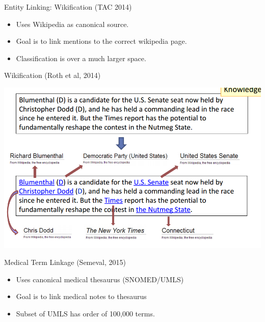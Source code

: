 \documentclass{beamer}
\begin{document}
\begin{frame}{Entity Linking: Wikification (TAC 2014)}
  \begin{itemize}
  \item Uses Wikipedia as canonical source.

    \air
  \item Goal is to link mentions to the correct wikipedia page. 

    \air
  \item Classification is over a much larger space. 
  \end{itemize}
\end{frame}


\begin{frame}{Wikification (Roth et al, 2014)}
  \begin{center}
    \includegraphics[width=\textwidth]{wikification}
  \end{center}
\end{frame}

\begin{frame}{Medical Term Linkage (Semeval, 2015) }
  \begin{itemize}
  \item Uses canonical medical thesaurus (SNOMED/UMLS)
    \air 
  \item Goal is to link medical notes to thesaurus
    \air 

  \item Subset of UMLS has order of 100,000 terms.
  \end{itemize}
\end{frame}
\end{document}
